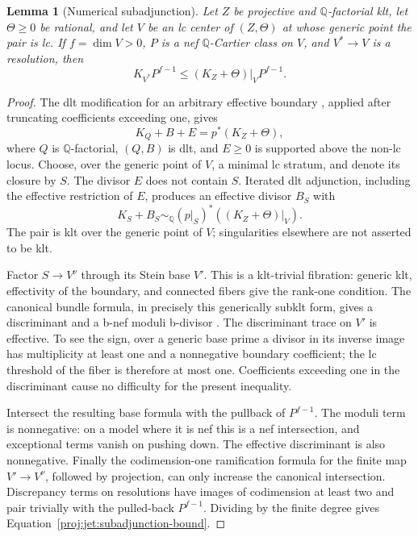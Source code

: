 \documentclass[11pt,letterpaper]{article}
\newtheorem{lemma}[theorem]{Lemma}
\theoremstyle{definition}
\theoremstyle{remark}
\begin{document}
\begin{lemma}[Numerical subadjunction]\label{proj:jet:subadjunction}
Let \(Z\) be projective and \(\mathbb{Q}\)-factorial klt, let
\(\Theta\ge0\) be rational, and let \(V\) be an lc center of
\((Z,\Theta)\) at whose generic point the pair is lc.
If \(f=\dim V>0\), \(P\) is a nef \(\mathbb{Q}\)-Cartier class on \(V\), and
\(V^*\to V\) is a resolution, then
\begin{equation}\label{proj:jet:subadjunction-bound}
 K_{V^*}P^{f-1}\le (K_Z+\Theta)|_V P^{f-1}.
\end{equation}
\end{lemma}

\begin{proof}
The dlt modification for an arbitrary effective boundary
\cite[Theorem~2.10]{Proj-FujinoHashizume2023}, applied after truncating
coefficients exceeding one, gives
\[
 K_Q+B+E=p^*(K_Z+\Theta),
\]
where \(Q\) is \(\mathbb{Q}\)-factorial, \((Q,B)\) is dlt, and \(E\ge0\)
is supported above the non-lc locus.  Choose, over the generic point
of \(V\), a minimal lc stratum, and denote its closure by \(S\).
The divisor \(E\) does not contain \(S\).  Iterated dlt adjunction,
including the effective restriction of \(E\), produces an effective
divisor \(B_S\) with
\[
 K_S+B_S\sim_{\mathbb{Q}}
 (p|_S)^*((K_Z+\Theta)|_V).
\]
The pair is klt over the generic point of \(V\); singularities elsewhere
are not asserted to be klt.

Factor \(S\to V^\nu\) through its Stein base \(V'\).  This is a
klt-trivial fibration: generic klt, effectivity of the boundary, and
connected fibers give the rank-one condition.  The canonical bundle
formula, in precisely this generically subklt form, gives a
discriminant and a b-nef moduli b-divisor
\cite[Definition~3.1 and Theorem~3.5]{Proj-FujinoGongyoModuli2014}.
The discriminant trace on \(V'\) is effective.  To see the sign,
over a generic base prime a divisor in its inverse image has
multiplicity at least one and a nonnegative boundary coefficient;
the lc threshold of the fiber is therefore at most one.
Coefficients exceeding one in the discriminant cause no difficulty
for the present inequality.

Intersect the resulting base formula with the pullback of \(P^{f-1}\).
The moduli term is nonnegative: on a model where it is nef this is a
nef intersection, and exceptional terms vanish on pushing down.
The effective discriminant is also nonnegative.  Finally the
codimension-one ramification formula for the finite map
\(V'\to V^\nu\), followed by projection, can only increase the
canonical intersection.  Discrepancy terms on resolutions have
images of codimension at least two and pair trivially with the
pulled-back \(P^{f-1}\).  Dividing by the finite degree gives
Equation~\eqref{proj:jet:subadjunction-bound}.
\end{proof}
\end{document}

